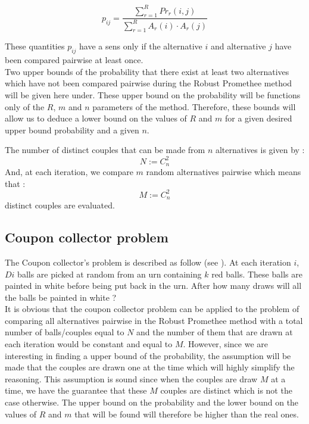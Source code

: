\begin{equation}
    \label{eqn:pij}
    p_{ij} = \frac{\sum\limits_{r=1}^R Pr_r(i,j)}{\sum\limits_{r=1}^R A_r(i)\cdot A_r(j)}
\end{equation}

These quantities $p_{ij}$ have a sens only if the alternative $i$ and alternative $j$ have been compared pairwise at least once.\\ 

Two upper bounds of the probability that there exist at least two alternatives which have not been compared pairwise during the Robust Promethee method will be given here under. These upper bound on the probability will be functions only of the $R$, $m$ and $n$ parameters of the method. Therefore, these bounds will allow us to deduce a lower bound on the values of $R$ and $m$ for a given desired upper bound probability and a given $n$.

The number of distinct couples that can be made from $n$ alternatives is given by :
\begin{equation}
    \label{def:couples}
    N:= C_n^2
\end{equation}
And, at each iteration, we compare $m$ random alternatives pairwise which means that :
\begin{equation}
    \label{def:iterationcouples}
    M:= C_n^2
\end{equation}
distinct couples are evaluated.

\subsection{Coupon collector problem}

The Coupon collector's problem is described as follow (see \cite{Kobza2007}). At each iteration $i$, $Di$ balls are picked at random from an urn containing $k$ red balls. These balls are painted in white before being put back in the urn. After how many draws will all the balls be painted in white ?\\

It is obvious that the coupon collector problem can be applied to the problem of comparing all alternatives pairwise in the Robust Promethee method with a total number of balls/couples equal to $N$ and the number of them that are drawn at each iteration would be constant and equal to $M$.
However, since we are interesting in finding a upper bound of the probability, the assumption will be made that the couples are drawn one at the time which will highly simplify the reasoning.
This assumption is sound since when the couples are draw $M$ at a time, we have the guarantee that these $M$ couples are distinct which is not the case otherwise. The upper bound on the probability and the lower bound on the values of $R$ and $m$ that will be found will therefore be higher than the real ones.

